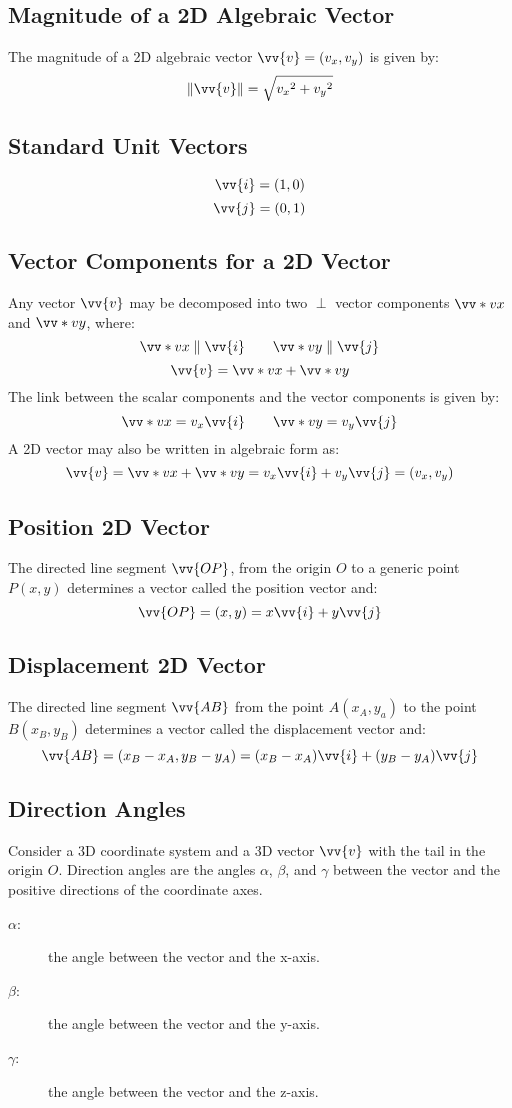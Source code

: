 		\subsection{Magnitude of a 2D Algebraic Vector}
			The magnitude of a 2D algebraic vector $\vv{v}=(v_x, v_y)$ is given by:
			\[\|\vv{v}\| = \sqrt{{v_x}^2 + {v_y}^2}\]
		\subsection{Standard Unit Vectors}
			\[\vv{i} = (1, 0)\]
			\[\vv{j} = (0, 1)\]
		\subsection{Vector Components for a 2D Vector}
			Any vector $\vv{v}$ may be decomposed into two $\perp$ vector components $\vv*{v}{x}$ and $\vv*{v}{y}$, where:
			\[\vv*{v}{x} \parallel \vv{i} \qquad \vv*{v}{y} \parallel \vv{j}\]
			\[\vv{v} = \vv*{v}{x} + \vv*{v}{y}\]
			The link between the scalar components and the vector components is given by:
			\[\vv*{v}{x} = v_x\vv{i} \qquad \vv*{v}{y} = v_y\vv{j}\]
			A 2D vector may also be written in algebraic form as:
			\[\vv{v} = \vv*{v}{x} + \vv*{v}{y} = v_x\vv{i} + v_y\vv{j} = (v_x, v_y)\]
		\subsection{Position 2D Vector}
			The directed line segment $\vv{OP}$, from the origin $O$ to a generic point $P(x, y)$ determines a vector called the position vector and:
			\[\vv{OP} = (x, y)  = x\vv{i} + y\vv{j}\]
		\subsection{Displacement 2D Vector}
			The directed line segment $\vv{AB}$ from the point $A(x_A, y_a)$ to the point $B(x_B, y_B)$ determines a vector called the displacement vector and:
			\[\vv{AB} = (x_B - x_A, y_B - y_A) = (x_B-x_A)\vv{i} + (y_B - y_A)\vv{j}\]
		\subsection{Direction Angles}
			Consider a 3D coordinate system and a 3D vector $\vv{v}$ with the tail in the origin $O$. Direction angles are the angles $\alpha$, $\beta$, and $\gamma$ between the vector and the positive directions of the coordinate axes.
			\begin{description}
				\item[$\alpha$:] the angle between the vector and the x-axis.
				\item[$\beta$:] the angle between the vector and the y-axis.
				\item[$\gamma$:] the angle between the vector and the z-axis.
			\end{description}
